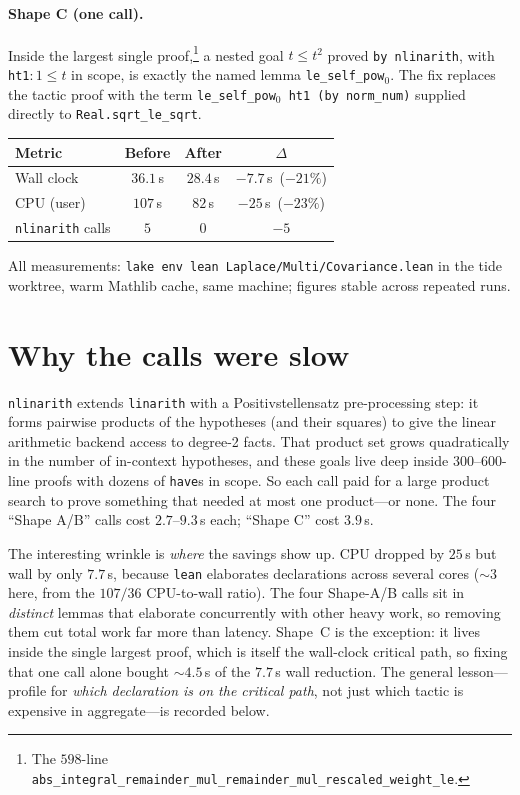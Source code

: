 \documentclass[11pt]{article}
\begin{document}
\paragraph{Shape C (one call).} Inside the largest single proof,\footnote{The
$598$-line \texttt{abs\_integral\_remainder\_mul\_remainder\_mul\_rescaled\_weight\_le}.}
a nested goal $t \leq t^2$ proved \texttt{by nlinarith}, with
\texttt{ht1}${}: 1 \leq t$ in scope, is exactly the named lemma
\texttt{le\_self\_pow$_0$}. The fix replaces the tactic proof with the term
\texttt{le\_self\_pow$_0$ ht1 (by norm\_num)} supplied directly to
\texttt{Real.sqrt\_le\_sqrt}.

\begin{center}
\begin{tabular}{lccc}
\toprule
Metric & Before & After & $\Delta$ \\
\midrule
Wall clock        & $36.1$\,s & $28.4$\,s & $-7.7$\,s\ ($-21\%$) \\
CPU (user)        & $107$\,s  & $82$\,s   & $-25$\,s\ ($-23\%$) \\
\texttt{nlinarith} calls & $5$ & $0$ & $-5$ \\
\bottomrule
\end{tabular}
\end{center}

\noindent All measurements: \texttt{lake env lean Laplace/Multi/Covariance.lean}
in the tide worktree, warm Mathlib cache, same machine; figures stable across
repeated runs.

\section{Why the calls were slow}

\texttt{nlinarith} extends \texttt{linarith} with a Positivstellensatz
pre-processing step: it forms pairwise products of the hypotheses (and their
squares) to give the linear arithmetic backend access to degree-2 facts. That
product set grows quadratically in the number of in-context hypotheses, and
these goals live deep inside $300$--$600$-line proofs with dozens of
\texttt{have}s in scope. So each call paid for a large product search to prove
something that needed at most one product---or none. The four ``Shape A/B''
calls cost $2.7$--$9.3$\,s each; ``Shape C'' cost $3.9$\,s.

The interesting wrinkle is \emph{where} the savings show up. CPU dropped by
$25$\,s but wall by only $7.7$\,s, because \texttt{lean} elaborates declarations
across several cores ($\sim$3 here, from the $107/36$ CPU-to-wall ratio). The
four Shape-A/B calls sit in \emph{distinct} lemmas that elaborate concurrently
with other heavy work, so removing them cut total work far more than latency.
Shape~C is the exception: it lives inside the single largest proof, which is
itself the wall-clock critical path, so fixing that one call alone bought
$\sim$$4.5$\,s of the $7.7$\,s wall reduction. The general lesson---profile for
\emph{which declaration is on the critical path}, not just which tactic is
expensive in aggregate---is recorded below.
\end{document}
